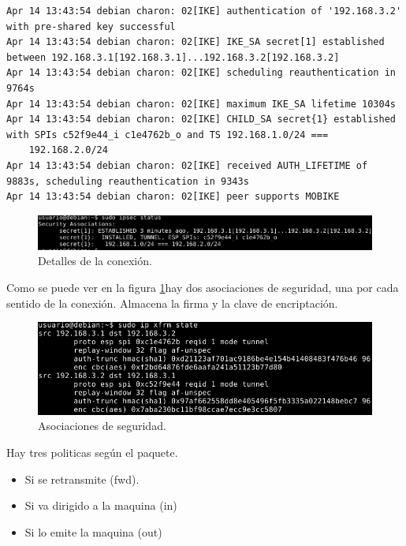 \documentclass[11pt]{article}
\begin{document}
\begin{lstlisting}
Apr 14 13:43:54 debian charon: 02[IKE] authentication of '192.168.3.2' with pre-shared key successful
Apr 14 13:43:54 debian charon: 02[IKE] IKE_SA secret[1] established between 192.168.3.1[192.168.3.1]...192.168.3.2[192.168.3.2]
Apr 14 13:43:54 debian charon: 02[IKE] scheduling reauthentication in 9764s
Apr 14 13:43:54 debian charon: 02[IKE] maximum IKE_SA lifetime 10304s
Apr 14 13:43:54 debian charon: 02[IKE] CHILD_SA secret{1} established with SPIs c52f9e44_i c1e4762b_o and TS 192.168.1.0/24 ===
    192.168.2.0/24
Apr 14 13:43:54 debian charon: 02[IKE] received AUTH_LIFETIME of 9883s, scheduling reauthentication in 9343s
Apr 14 13:43:54 debian charon: 02[IKE] peer supports MOBIKE
\end{lstlisting}

    \begin{figure}[H]
      \centering
      \includegraphics[width = \textwidth]{IPSstatus}
      \caption{Detalles de la conexión.}
    \end{figure}

    \par
    Como se puede ver en la figura \ref{fig:secasoc}hay dos asociaciones de
    seguridad, una por cada sentido de la conexión. Almacena la firma y la clave
    de encriptación.
    \begin{figure}[H]
      \centering
      \includegraphics[width = \textwidth]{asocSec}
      \caption{Asociaciones de seguridad.}
      \label{fig:secasoc}
    \end{figure}

    \par
    Hay tres politicas según el paquete.
    \begin{itemize}
      \item Si se retransmite (fwd).
      \item Si va dirigido a la maquina (in)
      \item Si lo emite la maquina (out)
    \end{itemize}
\end{document}
